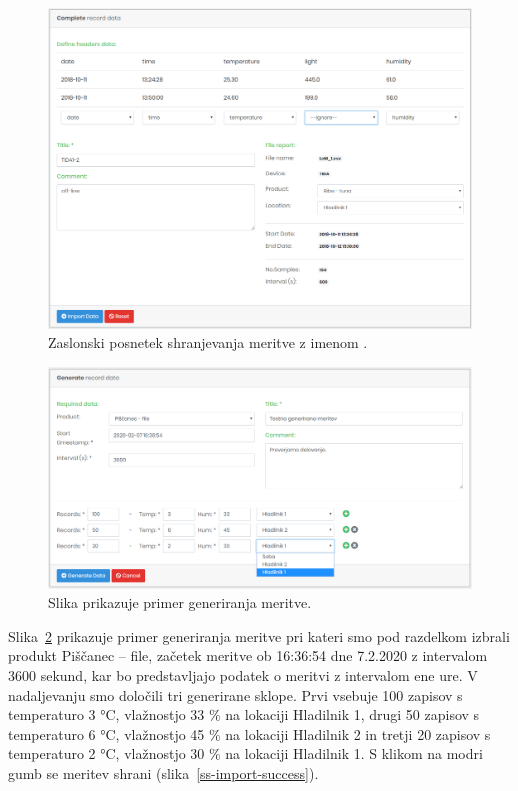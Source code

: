 \documentclass[a4paper, 12pt]{book}
\begin{document}
\begin{figure}[h]
\begin{center}
\includegraphics[width=\textwidth]{slike/import_data_tida.png}
\end{center}
\caption{Zaslonski posnetek shranjevanja meritve z imenom .}
\label{ss-import-data}
\end{figure}


\begin{figure}[h]
\begin{center}
\includegraphics[width=\textwidth]{slike/generate_data.png}
\end{center}
\caption{Slika prikazuje primer generiranja meritve.}
\label{ss-generate-data}
\end{figure}

Slika~\ref{ss-generate-data} prikazuje primer generiranja meritve pri kateri smo pod razdelkom  izbrali produkt Piščanec – file, začetek meritve ob 16:36:54 dne 7.2.2020 z intervalom 3600 sekund, kar bo predstavljajo podatek o meritvi z intervalom ene ure. V nadaljevanju smo določili tri generirane sklope. Prvi vsebuje 100 zapisov s temperaturo 3 °C, vlažnostjo 33 \% na lokaciji Hladilnik 1, drugi 50 zapisov s temperaturo 6 °C, vlažnostjo 45 \% na lokaciji Hladilnik 2 in tretji 20 zapisov s temperaturo 2 °C, vlažnostjo 30 \% na lokaciji Hladilnik 1. S klikom na modri gumb  se meritev shrani (slika~\ref{ss-import-success}).
\end{document}
